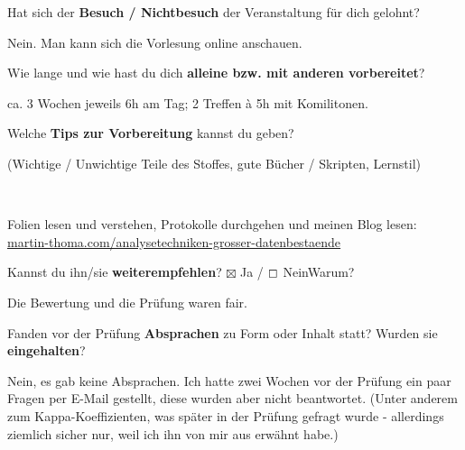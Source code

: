 \documentclass[a4paper]{article}
\begin{document}
 \begin{multicols}{2}

   Hat sich der \textbf{Besuch / Nichtbesuch} der Veranstaltung für dich gelohnt? \\
  \begin{minipage}[t][6.8cm]{\linewidth}
    Nein. Man kann sich die Vorlesung online anschauen.

  \end{minipage}

   Wie lange und wie hast du dich \textbf{alleine bzw. mit anderen vorbereitet}? \\
  \begin{minipage}[t][7cm]{\linewidth}
    ca. 3 Wochen jeweils 6h am Tag; 2 Treffen à 5h mit Komilitonen.

  \end{minipage}

   Welche \textbf{Tips zur Vorbereitung} kannst du geben?
  \begin{footnotesize}(Wichtige / Unwichtige Teile des Stoffes, gute Bücher / Skripten, Lernstil)\end{footnotesize} \\
  \begin{minipage}[t][7cm]{\linewidth}
    Folien lesen und verstehen, Protokolle durchgehen und
    meinen Blog lesen:\\
    \href{https://martin-thoma.com/analysetechniken-grosser-datenbestaende}{martin-thoma.com/analysetechniken-grosser-datenbestaende}
  \end{minipage}

\columnbreak

   Kannst du ihn/sie \textbf{weiterempfehlen}?
  $\boxtimes$ Ja / $\boxempty$ Nein\newline Warum? \\
  \begin{minipage}[t][6.8cm]{\linewidth}
    Die Bewertung und die Prüfung waren fair.
  \end{minipage}

   Fanden vor der Prüfung \textbf{Absprachen} zu Form oder Inhalt statt? Wurden sie \textbf{eingehalten}? \\
  \begin{minipage}[t][7cm]{\linewidth}
    Nein, es gab keine Absprachen. Ich hatte zwei Wochen vor der Prüfung ein
    paar Fragen per E-Mail gestellt, diese wurden aber nicht beantwortet.
    (Unter anderem zum Kappa-Koeffizienten, was später in der Prüfung gefragt
    wurde - allerdings ziemlich sicher nur, weil ich ihn von mir aus erwähnt habe.)


\end{minipage}
\end{multicols}
\end{document}
